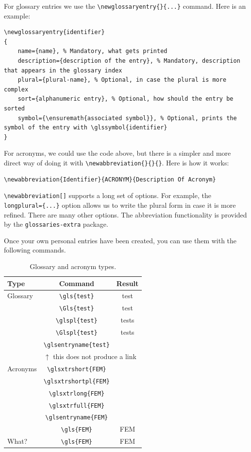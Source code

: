 For glossary entries we use the \verb|\newglossaryentry{}{...}| command. Here is an example:

\begin{lstlisting}[language={[LaTeX]TeX}]
\newglossaryentry{identifier}
{
	name={name}, % Mandatory, what gets printed
	description={description of the entry}, % Mandatory, description that appears in the glossary index
	plural={plural-name}, % Optional, in case the plural is more complex
	sort={alphanumeric entry}, % Optional, how should the entry be sorted
	symbol={\ensuremath{associated symbol}}, % Optional, prints the symbol of the entry with \glssymbol{identifier}
}
\end{lstlisting}

For acronyms, we could use the code above, but there is a simpler and more direct way of doing it with \verb|\newabbreviation{}{}{}|. Here is how it works:

\begin{lstlisting}[language={[LaTeX]TeX}]
\newabbreviation{Identifier}{ACRONYM}{Description Of Acronym}
\end{lstlisting}

\verb|\newabbreviation[]| supports a long set of options. For example, the \verb|longplural={...}| option allows us to write the plural form in case it is more refined. There are many other options. The abbreviation functionality is provided by the \verb|glossaries-extra| package.

Once your own personal entries have been created, you can use them with the following commands.

\begin{table}[h]
	\centering
	\begin{tabular}{lcc}
	  \toprule
	  Type & Command & Result \\
	  \midrule
	  Glossary & \verb|\gls{test}| & \gls{test} \\
		   & \verb|\Gls{test}| & \Gls{test} \\
		   & \verb|\glspl{test}| & \glspl{test} \\
		   & \verb|\Glspl{test}| & \Glspl{test} \\
		   & \verb|\glsentryname{test}| & \glsentryname{test} \\
		   & \multicolumn{2}{l}{$\uparrow$ this does not produce a link} \\
	  \cmidrule{2-3}
	  Acronyms & \verb|\glsxtrshort{FEM}| & \glsxtrshort{FEM} \\
		   & \verb|\glsxtrshortpl{FEM}| & \glsxtrshortpl{FEM} \\
		   & \verb|\glsxtrlong{FEM}| & \glsxtrlong{FEM} \\
		   & \verb|\glsxtrfull{FEM}| & \glsxtrfull{FEM} \\
		   & \verb|\glsentryname{FEM}| & \glsentryname{FEM} \\
	   & \verb|\gls{FEM}| & \gls{FEM} \\
	  What? & \verb|\gls{FEM}| & \gls{FEM} \\
	  \bottomrule
	\end{tabular}
	\caption{Glossary and acronym types.}
	\label{tab:glossaries}
\end{table}

